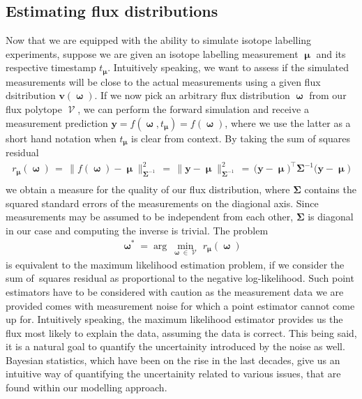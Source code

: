 \documentclass[10pt]{article}
\newcommand{\mb}[1]{\mathbf{#1}}
\DeclareMathOperator\fp{\mathcal{V}}
\DeclareMathOperator\bmu{\boldsymbol{\mu}}
\DeclareMathOperator\bomega{\boldsymbol{\omega}}
\begin{document}
\subsection{Estimating flux distributions}
\label{sec:estimating-flux-distributions}

Now that we are equipped with the ability to simulate isotope labelling experiments, 
suppose we are given an isotope labelling measurement $\bmu$ and its respective timestamp $t_{\bmu}$.
Intuitively speaking, we want to assess if the simulated measurements will be close to the actual
measurements using a given flux dsitribution $\mb{v}(\bomega)$.
If we now pick an arbitrary flux distribution $\bomega$ from our flux polytope $\fp$, 
we can perform the forward simulation and receive a measurement prediction ${\mb{y} = f(\bomega, t_{\bmu})} = f(\bomega)$,
where we use the latter as a short hand notation when $t_{\bmu}$ is clear from context.
By taking the sum of squares residual
\begin{align}
    r_{\bmu} ( \bomega ) \,=\, \big\| f(\bomega) - \bmu \big\|_{\mb{\Sigma}^{-1}}^2
			\,=\, \big\| \mb{y} - \bmu \big\|_{\mb{\Sigma}^{-1}}^2 
			\,=\, \big( \mb{y} - \bmu \big)^\top \mb{\Sigma}^{-1} \big( \mb{y} - \bmu \big)
    \label{eq:ssr} 
    \\[-12pt] \nonumber
\end{align}
we obtain a measure for the quality of our flux distribution, where $\mb{\Sigma}$ contains the squared
standard errors of the measurements on the diagional axis.
Since measurements may be assumed to be independent from each other, $\mb{\Sigma}$ is diagonal in our case
and computing the inverse is trivial.
The problem
\begin{align}
    \bomega^* = \arg\min_{\bomega \in \fp} \, r_{\bmu} ( \bomega )
\end{align}
is equivalent to the maximum likelihood estimation problem, if we consider the sum of~squares
residual as proportional to the negative log-likelihood.
Such point estimators have to be considered with caution as the measurement data we are provided 
comes with measurement noise for which a point estimator cannot come up for.
Intuitively speaking, the maximum likelihood estimator provides us the flux most likely to explain
the data, assuming the data is correct.
This being said, it is a natural goal to quantify the uncertainity introduced by the noise as well.
Bayesian statistics, which have been on the rise in the last decades, give us an intuitive way of quantifying
the uncertainity related to various issues, that are found within our modelling approach.
\end{document}
